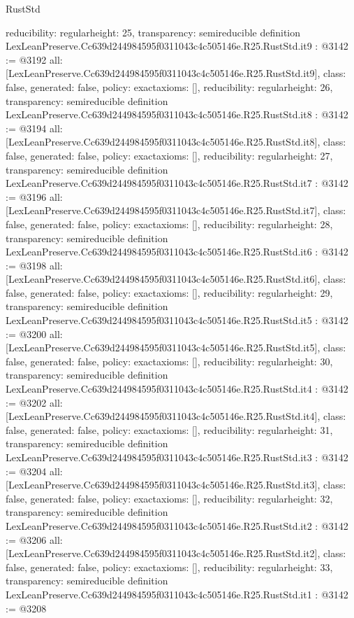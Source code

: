 \begin{lexlean}{RustStd}
\begin{coremodule}
{  reducibility: regular{height: 25},
  transparency: semireducible
}
definition LexLeanPreserve.Cc639d244984595f0311043c4c505146e.R25.RustStd.it9 : @3142 := @3192 {
  all: [LexLeanPreserve.Cc639d244984595f0311043c4c505146e.R25.RustStd.it9],
  class: false,
  generated: false,
  policy: exact{axioms: []},
  reducibility: regular{height: 26},
  transparency: semireducible
}
definition LexLeanPreserve.Cc639d244984595f0311043c4c505146e.R25.RustStd.it8 : @3142 := @3194 {
  all: [LexLeanPreserve.Cc639d244984595f0311043c4c505146e.R25.RustStd.it8],
  class: false,
  generated: false,
  policy: exact{axioms: []},
  reducibility: regular{height: 27},
  transparency: semireducible
}
definition LexLeanPreserve.Cc639d244984595f0311043c4c505146e.R25.RustStd.it7 : @3142 := @3196 {
  all: [LexLeanPreserve.Cc639d244984595f0311043c4c505146e.R25.RustStd.it7],
  class: false,
  generated: false,
  policy: exact{axioms: []},
  reducibility: regular{height: 28},
  transparency: semireducible
}
definition LexLeanPreserve.Cc639d244984595f0311043c4c505146e.R25.RustStd.it6 : @3142 := @3198 {
  all: [LexLeanPreserve.Cc639d244984595f0311043c4c505146e.R25.RustStd.it6],
  class: false,
  generated: false,
  policy: exact{axioms: []},
  reducibility: regular{height: 29},
  transparency: semireducible
}
definition LexLeanPreserve.Cc639d244984595f0311043c4c505146e.R25.RustStd.it5 : @3142 := @3200 {
  all: [LexLeanPreserve.Cc639d244984595f0311043c4c505146e.R25.RustStd.it5],
  class: false,
  generated: false,
  policy: exact{axioms: []},
  reducibility: regular{height: 30},
  transparency: semireducible
}
definition LexLeanPreserve.Cc639d244984595f0311043c4c505146e.R25.RustStd.it4 : @3142 := @3202 {
  all: [LexLeanPreserve.Cc639d244984595f0311043c4c505146e.R25.RustStd.it4],
  class: false,
  generated: false,
  policy: exact{axioms: []},
  reducibility: regular{height: 31},
  transparency: semireducible
}
definition LexLeanPreserve.Cc639d244984595f0311043c4c505146e.R25.RustStd.it3 : @3142 := @3204 {
  all: [LexLeanPreserve.Cc639d244984595f0311043c4c505146e.R25.RustStd.it3],
  class: false,
  generated: false,
  policy: exact{axioms: []},
  reducibility: regular{height: 32},
  transparency: semireducible
}
definition LexLeanPreserve.Cc639d244984595f0311043c4c505146e.R25.RustStd.it2 : @3142 := @3206 {
  all: [LexLeanPreserve.Cc639d244984595f0311043c4c505146e.R25.RustStd.it2],
  class: false,
  generated: false,
  policy: exact{axioms: []},
  reducibility: regular{height: 33},
  transparency: semireducible
}
definition LexLeanPreserve.Cc639d244984595f0311043c4c505146e.R25.RustStd.it1 : @3142 := @3208 {
}
\end{coremodule}
\end{lexlean}
